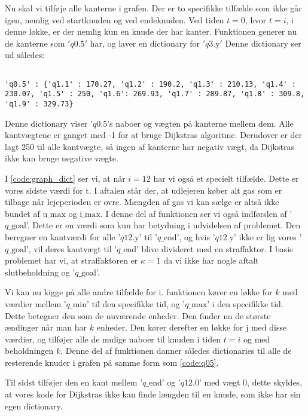 Nu skal vi tilføje alle kanterne i grafen. Der er to specifikke tilfælde som ikke går igen, nemlig ved startknuden og ved endeknuden. Ved tiden $t=0$, hvor $t=i$, i denne løkke, er der nemlig kun en knude der har kanter. Funktionen generer nu de kanterne som $'q\textrm{0.5}'$ har, og laver en dictionary for $'q\textrm{3.y}'$ 
Denne dictionary ser ud således:

\begin{lstlisting}[label=code:q05, caption=Dictionary for $q \textrm{0.5}$.]

'q0.5' : {'q1.1' : 170.27, 'q1.2' : 190.2, 'q1.3' : 210.13, 'q1.4' : 230.07, 'q1.5' : 250, 'q1.6': 269.93, 'q1.7' : 289.87, 'q1.8' : 309.8, 'q1.9' : 329.73}
\end{lstlisting}
Denne dictionary viser '$q0.5$'s naboer og vægten på kanterne mellem dem. Alle kantvægtene er ganget med -1 for at bruge Dijkstras algoritme. Derudover er der lagt 250 til alle kantvægte, så ingen af kanterne har negativ vægt, da Dijkstras ikke kan bruge negative vægte. 

I \autoref{code:graph_dict} ser vi, at når $i=12$ har vi også et specielt tilfælde. Dette er vores sidste værdi for $\textrm{t}$. I aftalen står der, at udlejeren køber alt gas som er tilbage når lejeperioden er ovre.   Mængden af gas vi kan sælge er altså ikke bundet af $\textrm{u\_max}$ og $\textrm{i\_max}$. I denne del af funktionen ser vi også indførslen af '$q\textrm{\_goal}$'. Dette er en værdi som kun har betydning i udvidelsen af problemet. Den beregner  en kantværdi for alle '$q\textrm{12.y}$' til '$q\textrm{\_end}$', og hvis '$q\textrm{12.y}$' ikke er lig vores '$q\textrm{\_goal}$', vil deres kantvægt til '$q\textrm{\_end}$' blive divideret med en straffaktor. I basis problemet har vi, at straffaktoren er $\kappa=1$ da vi ikke har nogle aftalt slutbeholdning og '$q\textrm{\_goal}$'.

Vi kan nu kigge på alle andre tilfælde for i. funktionen kører en løkke for $k$ med værdier mellem '$q\textrm{\_min}$' til den specifikke tid, og '$q\textrm{\_max}$' i den specifikke tid. Dette betegner den som de nuværende enheder.
Den finder nu de største ændinger når man har $k$ enheder. Den kører derefter en løkke for $\textrm{j}$ med disse værdier, og tilføjer alle de mulige naboer til knuden i tiden $t=i$ og med beholdningen $k$. Denne del af funktionen danner således dictionaries til alle de resterende knuder i grafen på samme form som \autoref{code:q05}.

Til sidst tilføjer den en kant mellem '$q\textrm{\_end}$' og '$q12.0$' med vægt $0$, dette skyldes, at vores kode for Dijkstras ikke kan finde længden til en knude, som ikke har sin egen dictionary.

